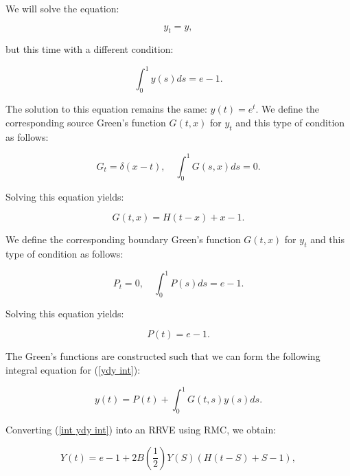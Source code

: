 \documentclass[a4paper,12pt]{article}
\begin{document}
\begin{example}[$y_t=y$ average condition]
    We will solve the equation:

    \begin{equation} \label{ydy int}
        y_t = y,
    \end{equation}

    but this time with a different condition:

    \begin{equation}
        \int_{0}^{1} y(s) ds = e-1.
    \end{equation}

    The solution to this equation remains the same: $y(t) = e^{t}$.
    We define the corresponding source Green's function $G(t,x)$ for $y_t$
    and this type of condition as follows:

    \begin{equation}
        G_t = \delta(x-t), \quad \int_{0}^{1} G(s,x) ds = 0.
    \end{equation}

    Solving this equation yields:

    \begin{equation}
        G(t,x) = H(t-x) + x - 1.
    \end{equation}

    We define the corresponding boundary Green's function $G(t,x)$ for $y_t$
    and this type of condition as follows:

    \begin{equation}
        P_{t} = 0, \quad \int_{0}^{1} P(s) ds = e -1.
    \end{equation}

    Solving this equation yields:

    \begin{equation}
        P(t) = e -1.
    \end{equation}

    The Green's functions are constructed such that
    we can form the following integral equation for (\ref{ydy int}):

    \begin{equation} \label{int ydy int}
        y(t) = P(t) + \int_{0}^{1} G(t,s) y(s) ds.
    \end{equation}

    Converting (\ref{int ydy int}) into an RRVE
    using RMC, we obtain:

    \begin{equation}\label{RRVE ydy int}
        Y(t) = e - 1 + 2B\left(\frac{1}{2}\right)Y(S)(H(t-S)+S-1),
    \end{equation}


\end{example}
\end{document}
